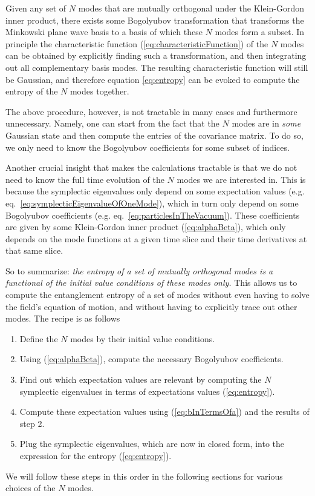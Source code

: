 \documentclass[11pt, a4paper]{article}
\begin{document}
Given any set of $N$ modes that are mutually orthogonal under the Klein-Gordon inner product, there exists some Bogolyubov transformation that transforms the Minkowski plane wave basis to a basis of which these $N$ modes form a subset. In principle the characteristic function (\ref{eq:characteristicFunction}) of the $N$ modes can be obtained by explicitly finding such a transformation, and then integrating out all complementary basis modes. The resulting characteristic function will still be Gaussian, and therefore equation \ref{eq:entropy} can be evoked to compute the entropy of the $N$ modes together. 

The above procedure, however, is not tractable in many cases and furthermore unnecessary. Namely, one can start from the fact that the $N$ modes are in \emph{some} Gaussian state and then compute the entries of the covariance matrix. To do so, we only need to know the Bogolyubov coefficients for some subset of indices. 

Another crucial insight that makes the calculations tractable is that we do not need to know the full time evolution of the $N$ modes we are interested in. This is because the symplectic eigenvalues only depend on some expectation values (e.g.  eq.~\ref{eq:symplecticEigenvalueOfOneMode}), which in turn only depend on some Bogolyubov coefficients (e.g. eq.~\ref{eq:particlesInTheVacuum}). These coefficients are given by some Klein-Gordon inner product (\ref{eq:alphaBeta}), which only depends on the mode functions at a given time slice and their time derivatives at that same slice. 

So to summarize: \emph{the entropy of a set of mutually orthogonal modes is a functional of the initial value conditions of these modes only.} This allows us to compute the entanglement entropy of a set of modes without even having to solve the field's equation of motion, and without having to explicitly trace out other modes. The recipe is as follows

\begin{enumerate}
\item Define the $N$ modes by their initial value conditions.

\item Using (\ref{eq:alphaBeta}), compute the necessary Bogolyubov coefficients.
\item Find out which expectation values are relevant by computing the $N$ symplectic eigenvalues in terms of expectations values (\ref{eq:entropy}).
\item Compute these expectation values using (\ref{eq:bInTermsOfa}) and the results of step 2.
\item Plug the symplectic eigenvalues, which are now in closed form, into the expression for the entropy (\ref{eq:entropy}).  
\end{enumerate}
We will follow these steps in this order in the following sections for various choices of the $N$ modes.
  
\end{document}

